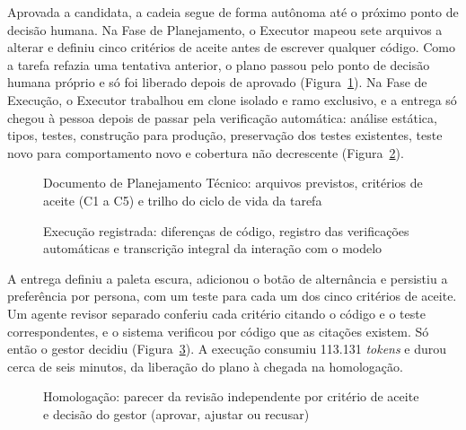 Aprovada a candidata, a cadeia segue de forma autônoma até o próximo ponto de decisão humana. Na Fase de Planejamento, o Executor mapeou sete arquivos a alterar e definiu cinco critérios de aceite antes de escrever qualquer código. Como a tarefa refazia uma tentativa anterior, o plano passou pelo ponto de decisão humana próprio e só foi liberado depois de aprovado (Figura~\ref{fig:13}). Na Fase de Execução, o Executor trabalhou em clone isolado e ramo exclusivo, e a entrega só chegou à pessoa depois de passar pela verificação automática: análise estática, tipos, testes, construção para produção, preservação dos testes existentes, teste novo para comportamento novo e cobertura não decrescente (Figura~\ref{fig:14}).

\begin{figure}[htb]
\centering
\caption{Documento de Planejamento Técnico: arquivos previstos, critérios de aceite (C1 a C5) e trilho do ciclo de vida da tarefa}
\label{fig:13}
\end{figure}

\begin{figure}[htb]
\centering
\caption{Execução registrada: diferenças de código, registro das verificações automáticas e transcrição integral da interação com o modelo}
\label{fig:14}
\end{figure}

A entrega definiu a paleta escura, adicionou o botão de alternância e persistiu a preferência por persona, com um teste para cada um dos cinco critérios de aceite. Um agente revisor separado conferiu cada critério citando o código e o teste correspondentes, e o sistema verificou por código que as citações existem. Só então o gestor decidiu (Figura~\ref{fig:15}). A execução consumiu 113.131 \textit{tokens} e durou cerca de seis minutos, da liberação do plano à chegada na homologação.

\begin{figure}[htb]
\centering
\caption{Homologação: parecer da revisão independente por critério de aceite e decisão do gestor (aprovar, ajustar ou recusar)}
\label{fig:15}
\end{figure}

